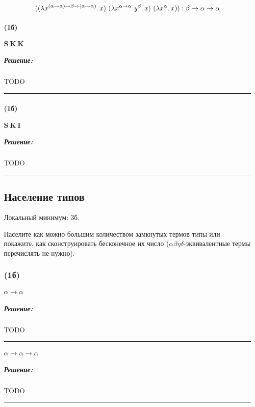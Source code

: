 \documentclass{article}
\newenvironment{proof}{\subparagraph{\hspace{-1em}Решение:\newline}}{\par\noindent\rule{\textwidth}{0.4pt}}
\newcommand{\term}[1]{\mathbf{#1}}
\newcommand{\ap}{~}
\begin{document}
    \[((\lambda x^{(\alpha \to \alpha) \to \beta \to (\alpha \to \alpha)}\ldotp x) \ap (\lambda x^{\alpha \to \alpha} \ap y^\beta\ldotp x) \ap (\lambda x^\alpha\ldotp x)):
    \beta \to \alpha \to \alpha\]

    \paragraph{(1б)} $\term{S} \ap \term{K} \ap \term{K}$

    \begin{proof}
        TODO %
    \end{proof}

    \paragraph{(1б)} $\term{S} \ap \term{K} \ap \term{I}$

    \begin{proof}
        TODO %
    \end{proof}

    \subsection{Население типов}

    Локальный минимум: 3б.

    Населите как можно большим количеством замкнутых термов типы или покажите, как
    сконструировать бесконечное их число ($\alpha\beta\eta\delta$-эквивалентные
    термы перечислять не нужно).

    \subsubsection{(1б)}

    \paragraph{} $\alpha \to \alpha$

    \begin{proof}
        TODO %
    \end{proof}

    \paragraph{} $\alpha \to \alpha \to \alpha$

    \begin{proof}
        TODO %
    \end{proof}
\end{document}
